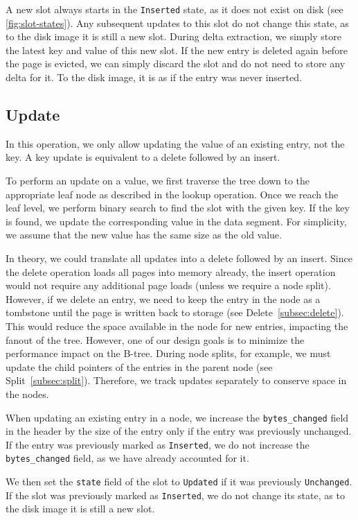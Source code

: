 A new slot always starts in the \texttt{Inserted} state, as it does not exist on disk (see \autoref{fig:slot-states}).
Any subsequent updates to this slot do not change this state, as to the disk image it is still a new slot.
During delta extraction, we simply store the latest key and value of this new slot.
If the new entry is deleted again before the page is evicted, we can simply discard the slot and do not need to store any delta for it.
To the disk image, it is as if the entry was never inserted.

\subsection*{Update}
In this operation, we only allow updating the value of an existing entry, not the key.
A key update is equivalent to a delete followed by an insert.

To perform an update on a value, we first traverse the tree down to the appropriate leaf node as described in the lookup operation.
Once we reach the leaf level, we perform binary search to find the slot with the given key.
If the key is found, we update the corresponding value in the data segment.
For simplicity, we assume that the new value has the same size as the old value.

In theory, we could translate all updates into a delete followed by an insert.
Since the delete operation loads all pages into memory already, the insert operation would not require any additional page loads (unless we require a node split).
However, if we delete an entry, we need to keep the entry in the node as a tombstone until the page is written back to storage (see Delete~\ref{subsec:delete}).
This would reduce the space available in the node for new entries, impacting the fanout of the tree.
However, one of our design goals is to minimize the performance impact on the B-tree.
During node splits, for example, we must update the child pointers of the entries in the parent node (see Split~\ref{subsec:split}).
Therefore, we track updates separately to conserve space in the nodes.

When updating an existing entry in a node, we increase the \texttt{bytes\_changed} field in the header by the size of the entry only if the entry was previously unchanged.
If the entry was previously marked as \texttt{Inserted}, we do not increase the \texttt{bytes\_changed} field, as we have already accounted for it.

We then set the \texttt{state} field of the slot to \texttt{Updated} if it was previously \texttt{Unchanged}.
If the slot was previously marked as \texttt{Inserted}, we do not change its state, as to the disk image it is still a new slot.

